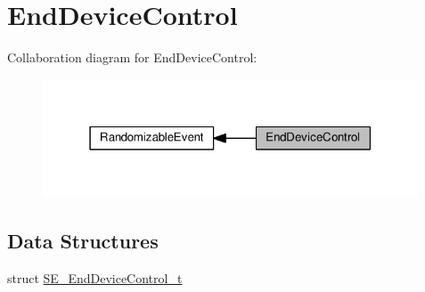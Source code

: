 \hypertarget{group__EndDeviceControl}{}\section{End\+Device\+Control}
\label{group__EndDeviceControl}
Collaboration diagram for End\+Device\+Control\+:\nopagebreak
\begin{figure}[H]
\begin{center}
\leavevmode
\includegraphics[width=316pt]{group__EndDeviceControl}
\end{center}
\end{figure}
\subsection*{Data Structures}
\begin{DoxyCompactItemize}
\item 
struct \hyperlink{structSE__EndDeviceControl__t}{S\+E\+\_\+\+End\+Device\+Control\+\_\+t}
\end{DoxyCompactItemize}

